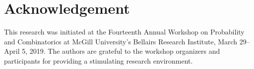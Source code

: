 \documentclass{patmorin}
\begin{document}
  
  
% 
% 
% 
% 
% 
% 
% 
% 
% 










\section*{Acknowledgement}

This research was initiated at the Fourteenth Annual Workshop on Probability and Combinatorics at McGill University's Bellairs Research Institute, March 29--April 5, 2019.  The authors are grateful to the workshop organizers and participants for providing a stimulating research environment.




\end{document}

